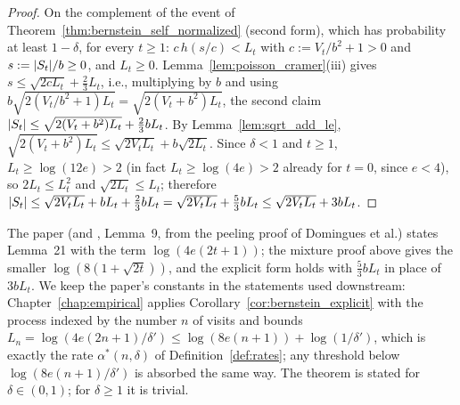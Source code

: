 \begin{proof}
\leanok
On the complement of the event of Theorem~\ref{thm:bernstein_self_normalized} (second form), which
has probability at least $1 - \delta$, for every $t \ge 1$: $c\, h(s/c) < L_t$ with
$c := V_t/b^2 + 1 > 0$ and $s := \lvert S_t \rvert/b \ge 0$, and $L_t \ge 0$. Lemma~\ref{lem:poisson_cramer}(iii)
gives $s \le \sqrt{2cL_t} + \frac23 L_t$, i.e., multiplying by $b$ and using
$b\sqrt{2(V_t/b^2 + 1)L_t} = \sqrt{2(V_t + b^2)L_t}$, the second claim
$\lvert S_t \rvert \le \sqrt{2(V_t + b^2)L_t} + \frac23 bL_t$. By Lemma~\ref{lem:sqrt_add_le},
$\sqrt{2(V_t + b^2)L_t} \le \sqrt{2V_tL_t} + b\sqrt{2L_t}$. Since $\delta < 1$ and $t \ge 1$,
$L_t \ge \log(12e) > 2$ (in fact $L_t \ge \log(4e) > 2$ already for $t = 0$, since $e < 4$), so
$2L_t \le L_t^2$ and $\sqrt{2L_t} \le L_t$; therefore
$\lvert S_t \rvert \le \sqrt{2V_tL_t} + bL_t + \frac23 bL_t = \sqrt{2V_tL_t} + \frac53 bL_t \le \sqrt{2V_tL_t} + 3bL_t$.
\end{proof}

\begin{remark}[Constants]\label{rem:pconc_bernstein_constants}
The paper (and \cite{menard2021fast}, Lemma~9, from the peeling proof of Domingues et al.)
states Lemma~21 with the term $\log(4e(2t + 1))$; the mixture proof above gives the smaller
$\log(8(1 + \sqrt{2t}))$, and the explicit form holds with $\frac53 b L_t$ in place of $3bL_t$. We
keep the paper's constants in the statements used downstream: Chapter~\ref{chap:empirical}
applies Corollary~\ref{cor:bernstein_explicit} with the process indexed by the number $n$ of
visits and bounds $L_n = \log(4e(2n + 1)/\delta') \le \log(8e(n + 1)) + \log(1/\delta')$, which
is exactly the rate $\alpha^*(n, \delta)$ of Definition~\ref{def:rates}; any threshold below
$\log(8e(n + 1)/\delta')$ is absorbed the same way. The theorem is stated for $\delta \in (0, 1)$;
for $\delta \ge 1$ it is trivial.
\end{remark}

